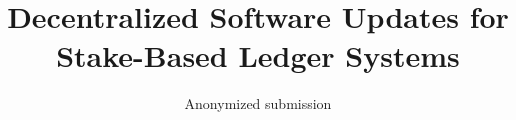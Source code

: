 \title{Decentralized Software Updates for Stake-Based Ledger Systems}
\author{Anonymized submission}


%

\maketitle
